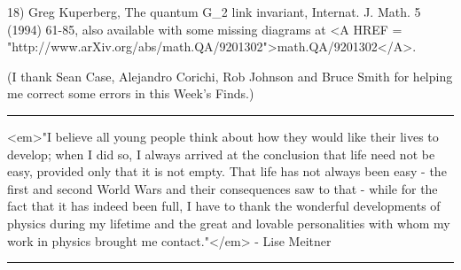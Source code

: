 18) Greg Kuperberg, The quantum G_{2} link invariant, Internat. 
J. Math. 5 (1994) 61-85, also available with some missing diagrams at
<A HREF = "http://www.arXiv.org/abs/math.QA/9201302">math.QA/9201302</A>.

(I thank Sean Case, Alejandro Corichi, Rob Johnson and Bruce Smith
for helping me correct some errors in this Week's Finds.)  
\par\noindent\rule{\textwidth}{0.4pt}
<em>"I believe all young people think about how they would like their
lives to develop; when I did so, I always arrived at the conclusion
that life need not be easy, provided only that it is not empty. 
That life has not always been easy - the first and second World
Wars and their consequences saw to that - while for the fact that it has
indeed been full, I have to thank the wonderful developments of
physics during my lifetime and the great and lovable personalities
with whom my work in physics brought me contact."</em> - Lise Meitner


\par\noindent\rule{\textwidth}{0.4pt}

